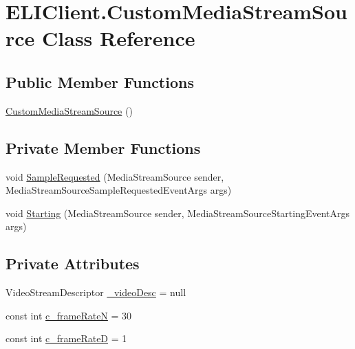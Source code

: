 \hypertarget{class_e_l_i_client_1_1_custom_media_stream_source}{}\section{E\+L\+I\+Client.\+Custom\+Media\+Stream\+Source Class Reference}
\label{class_e_l_i_client_1_1_custom_media_stream_source}
\subsection*{Public Member Functions}
\begin{DoxyCompactItemize}
\item 
\hyperlink{class_e_l_i_client_1_1_custom_media_stream_source_aa9e66fc00c35cb287b289403cb02151d}{Custom\+Media\+Stream\+Source} ()
\end{DoxyCompactItemize}
\subsection*{Private Member Functions}
\begin{DoxyCompactItemize}
\item 
void \hyperlink{class_e_l_i_client_1_1_custom_media_stream_source_a6559db3e7cea7ad8345c20736e4dd1f1}{Sample\+Requested} (Media\+Stream\+Source sender, Media\+Stream\+Source\+Sample\+Requested\+Event\+Args args)
\item 
void \hyperlink{class_e_l_i_client_1_1_custom_media_stream_source_a33e5647430ba46b7167f145fb8daac60}{Starting} (Media\+Stream\+Source sender, Media\+Stream\+Source\+Starting\+Event\+Args args)
\end{DoxyCompactItemize}
\subsection*{Private Attributes}
\begin{DoxyCompactItemize}
\item 
Video\+Stream\+Descriptor \hyperlink{class_e_l_i_client_1_1_custom_media_stream_source_aa26836be4b3c8a35758dbcc21b5d62a0}{\+\_\+video\+Desc} = null
\item 
const int \hyperlink{class_e_l_i_client_1_1_custom_media_stream_source_ab060659fb19df455b86d5bd6fe5bf691}{c\+\_\+frame\+RateN} = 30
\item 
const int \hyperlink{class_e_l_i_client_1_1_custom_media_stream_source_a6e79c416317129330d6f892269b14560}{c\+\_\+frame\+RateD} = 1
\end{DoxyCompactItemize}


